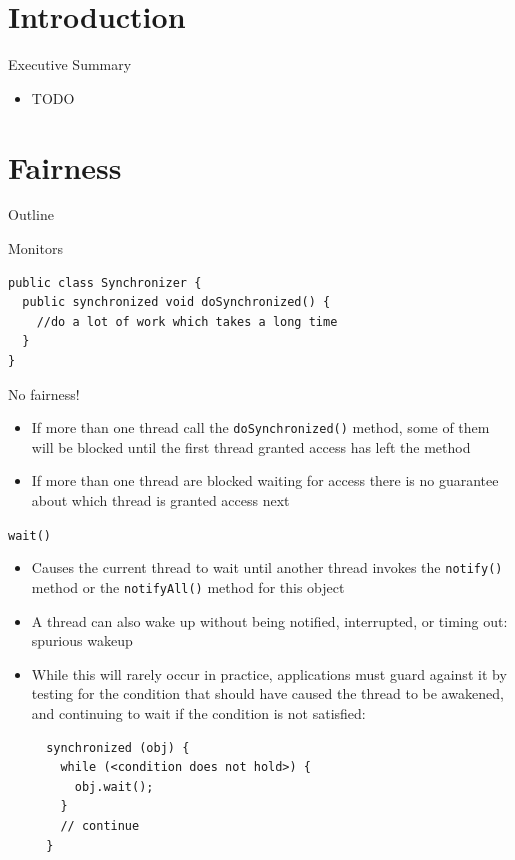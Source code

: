 \section*{Introduction}

\begin{frame}{Executive Summary}
  \begin{itemize}
  \item TODO
  \end{itemize}
\end{frame}


\section{Fairness}

\begin{frame}{Outline}
  \tableofcontents[current]
\end{frame}

\begin{frame}[fragile]{Monitors}
\begin{lstlisting}
public class Synchronizer {
  public synchronized void doSynchronized() {
    //do a lot of work which takes a long time
  }
}
\end{lstlisting}


  \begin{alertblock}{No fairness!}
    \begin{itemize}
    \item If more than one thread call the
      \lstinline!doSynchronized()!  method, some of them will be
      blocked until the first thread granted access has left the
      method
    \item If more than one thread are blocked waiting for access there
      is no guarantee about which thread is granted access next
    \end{itemize}
  \end{alertblock}
\end{frame}

\begin{frame}[fragile]{\lstinline!wait()!}
  \begin{itemize}
  \item Causes the current thread to wait until another thread invokes
    the \lstinline!notify()! method or the \lstinline!notifyAll()!
    method for this object
  \item A thread can also wake up without being notified, interrupted,
    or timing out: \alert{spurious wakeup}
  \item While this will rarely occur in practice, applications must
    guard against it by testing for the condition that should have
    caused the thread to be awakened, and continuing to wait if the
    condition is not satisfied:
\begin{lstlisting}
  synchronized (obj) {
    while (<condition does not hold>) {
      obj.wait();
    }
    // continue
  }
\end{lstlisting} 
  \end{itemize}
\end{frame}

